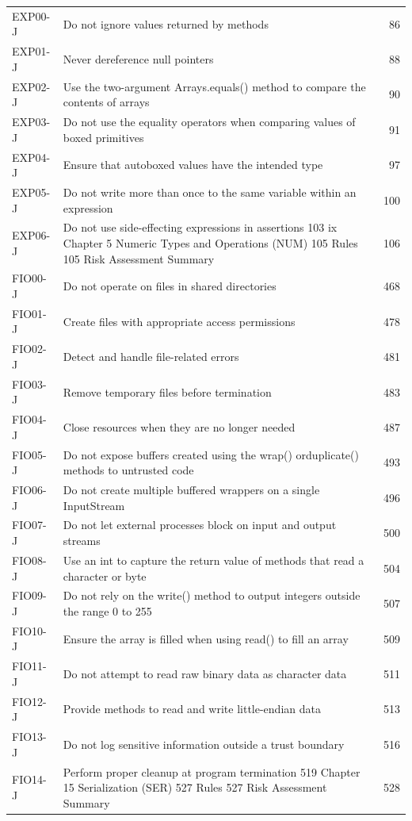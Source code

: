 \documentclass[11pt]{report}
\begin{document}
\begin{longtable}{@{}llr@{}}
EXP00-J & Do not ignore values returned by methods & 86\\
EXP01-J & Never dereference null pointers & 88\\
EXP02-J & Use the two-argument Arrays.equals() method to compare the contents of arrays & 90\\
EXP03-J & Do not use the equality operators when comparing values of boxed primitives & 91\\
EXP04-J & Ensure that autoboxed values have the intended type & 97\\
EXP05-J & Do not write more than once to the same variable within an expression & 100\\
EXP06-J & Do not use side-effecting expressions in assertions 103 ix Chapter 5 Numeric Types and Operations (NUM) 105 Rules 105 Risk Assessment Summary & 106\\
FIO00-J & Do not operate on files in shared directories & 468\\
FIO01-J & Create files with appropriate access permissions & 478\\
FIO02-J & Detect and handle file-related errors & 481\\
FIO03-J & Remove temporary files before termination & 483\\
FIO04-J & Close resources when they are no longer needed & 487\\
FIO05-J & Do not expose buffers created using the wrap() orduplicate() methods to untrusted code & 493\\
FIO06-J & Do not create multiple buffered wrappers on a single InputStream & 496\\
FIO07-J & Do not let external processes block on input and output streams & 500\\
FIO08-J & Use an int to capture the return value of methods that read a character or byte & 504\\
FIO09-J & Do not rely on the write() method to output integers outside the range 0 to 255 & 507\\
FIO10-J & Ensure the array is filled when using read() to fill an array & 509\\
FIO11-J & Do not attempt to read raw binary data as character data & 511\\
FIO12-J & Provide methods to read and write little-endian data & 513\\
FIO13-J & Do not log sensitive information outside a trust boundary & 516\\
FIO14-J & Perform proper cleanup at program termination 519 Chapter 15 Serialization (SER) 527 Rules 527 Risk Assessment Summary & 528\\

\end{longtable}
\end{document}
